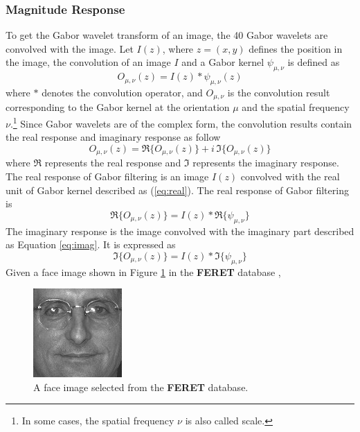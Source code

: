 \subsubsection{Magnitude Response} 
To get the Gabor wavelet transform of an image, the 40 Gabor wavelets are convolved with the image. Let $I(z)$, where $z=(x,y)$ defines the position in the image, the convolution of an image $I$ and a Gabor kernel $\psi_{\mu,\nu}$ is defined as
\begin{equation}\label{eq:conv}
 O_{\mu,\nu}(z)=I(z)\ast\psi_{\mu,\nu}(z)
\end{equation}
where $*$ denotes the convolution operator, and $O_{\mu,\nu}$ is the convolution result corresponding to the Gabor kernel at the orientation $\mu$ and the spatial frequency $\nu$.\footnote{In some cases, the spatial frequency $\nu$ is also called scale.} Since Gabor wavelets are of the complex form, the convolution results contain the real response and imaginary response as follow
\begin{displaymath}
 O_{\mu,\nu}(z) = \Re\{O_{\mu,\nu}(z)\} +i\,\Im\{O_{\mu,\nu}(z)\}
\end{displaymath}
where $\Re$ represents the real response and $\Im$ represents the imaginary response. The real response of Gabor filtering is an image $I(z)$ convolved with the real unit of Gabor kernel described as (\ref{eq:real}). The real response of Gabor filtering is 
\begin{equation}
 \Re\{O_{\mu,\nu}(z)\} = I(z) *  \Re\{\psi_{\mu,\nu}\}
\end{equation}
The imaginary response is the image convolved with the imaginary part described as \mbox{Equation} \ref{eq:imag}. It is expressed as
\begin{equation}
 \Im\{O_{\mu,\nu}(z)\} = I(z) *  \Im\{\psi_{\mu,\nu}\}
\end{equation}
Given a face image shown in \mbox{Figure} \ref{fig:afaceimage} in the \textbf{FERET} database \cite{Phillips2000}, 
\begin{figure}[t]
 \begin{center}
   \includegraphics[scale=0.75]{ch4/figures/FERET.jpg}
   \caption{A face image selected from the \textbf{FERET} database.}
   \label{fig:afaceimage}
 \end{center}
\end{figure} 
